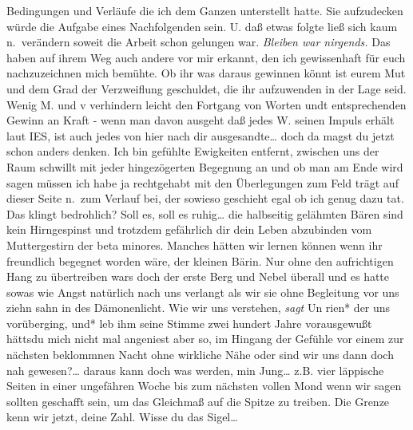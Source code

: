 \documentclass[
]{article}
\begin{document}
Bedingungen und Verläufe die ich dem Ganzen unterstellt hatte. Sie
aufzudecken würde die Aufgabe eines Nachfolgenden sein. U. daß etwas
folgte ließ sich kaum n.~verändern soweit die Arbeit schon gelungen war.
\emph{Bleiben war nirgends.} Das haben auf ihrem Weg auch andere vor mir
erkannt, den ich gewissenhaft für euch nachzuzeichnen mich bemühte. Ob
ihr was daraus gewinnen könnt ist eurem Mut und dem Grad der
Verzweiflung geschuldet, die ihr aufzuwenden in der Lage seid.\\
Wenig M. und v verhindern leicht den Fortgang von Worten undt
entsprechenden Gewinn an Kraft - wenn man davon ausgeht daß jedes W.
seinen Impuls erhält laut IES, ist auch jedes von hier nach dir
ausgesandte\ldots{} doch da magst du jetzt schon anders denken. Ich bin
gefühlte Ewigkeiten entfernt, zwischen uns der Raum schwillt mit jeder
hingezögerten Begegnung an und ob man am Ende wird sagen müssen ich habe
ja rechtgehabt mit den Überlegungen zum Feld trägt auf dieser Seite
n.~zum Verlauf bei, der sowieso geschieht egal ob ich genug dazu tat.
Das klingt bedrohlich? Soll es, soll es ruhig\ldots{} die halbseitig
gelähmten Bären sind kein Hirngespinst und trotzdem gefährlich dir dein
Leben abzubinden vom Muttergestirn der beta minores. Manches hätten wir
lernen können wenn ihr freundlich begegnet worden wäre, der kleinen
Bärin. Nur ohne den aufrichtigen Hang zu übertreiben wars doch der erste
Berg und Nebel überall und es hatte sowas wie Angst natürlich nach uns
verlangt als wir sie ohne Begleitung vor uns ziehn sahn in des
Dämonenlicht. Wie wir uns verstehen, \emph{sagt }Un rien* der uns
vorüberging, und* leb ihm seine Stimme zwei hundert Jahre vorausgewußt
hättsdu mich nicht mal angeniest aber so, im Hingang der Gefühle vor
einem zur nächsten beklommnen Nacht ohne wirkliche Nähe oder sind wir
uns dann doch nah gewesen?\ldots{} daraus kann doch was werden, min
Jung\ldots{} z.B. vier läppische Seiten in einer ungefähren Woche bis
zum nächsten vollen Mond wenn wir sagen sollten geschafft sein, um das
Gleichmaß auf die Spitze zu treiben. Die Grenze kenn wir jetzt, deine
Zahl. Wisse du das Sigel\ldots{}
\end{document}
